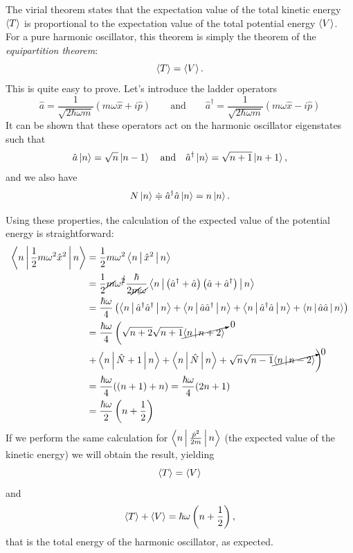 \documentclass[a4paper,twoside,11pt]{book}
\begin{document}
The virial theorem states that the expectation value of the total kinetic energy $\Braket{T}$ is proportional to the expectation value of the total potential energy $\Braket{V}$. For a pure harmonic oscillator, this theorem is simply the theorem of the \emph{equipartition theorem}:
\begin{equation}
	\Braket{T} = \Braket{V}.
\end{equation}
This is quite easy to prove. Let's introduce the ladder operators
\begin{equation}
	\hat{a}=\frac{1}{\sqrt{2 \hbar \omega m}} \left( m \omega \hat{x}+ i \hat{p} \right)
	\qquad \text{and} \qquad
	\hat{a}^{\dagger}=\frac{1}{\sqrt{2 \hbar \omega m}} \left( m \omega \hat{x}- i \hat{p} \right)
\end{equation}
It can be shown that these operators act on the harmonic oscillator eigenstates such that
\begin{equation}
	\hat{a} \Ket{n} =\sqrt{n} \Ket{n-1}
	\quad \text{and} \quad 
	\hat{a}^{\dagger} \Ket{n} =\sqrt{n+1} \Ket{n+1},
\end{equation}
and we also have
\begin{equation}
	N\Ket{n} \doteqdot \hat{a}^{\dagger}\hat{a}\Ket{n} = n\Ket{n}.
\end{equation}

Using these properties, the calculation of the expected value of the potential energy is straightforward:
\begin{align}
	\Braket{n|\frac{1}{2}m\omega^2\hat{x}^2|n}
	&= \frac{1}{2}m\omega^2\Braket{n|\hat{x}^2|n} \\
	&= \frac{1}{2}\cancel{m}\omega^{\cancel{2}}\frac{\hbar}{2\cancel{m}\cancel{\omega}}\Braket{n|\left(\hat{a}^{\dagger}+\hat{a}\right)\left(\hat{a}+\hat{a}^{\dagger}\right)|n} \\
	&= \frac{\hbar\omega}{4} \left(\Braket{n|\hat{a}^{\dagger}\hat{a}^{\dagger}|n}+\Braket{n|\hat{a}\hat{a}^{\dagger}|n}+\Braket{n|\hat{a}^{\dagger}\hat{a}|n}+\Braket{n|\hat{a}\hat{a}|n}\right) \\
	&= \frac{\hbar\omega}{4} \left(\sqrt{n+2}\sqrt{n+1}\cancelto{0}{\Braket{n|n+2}}\right. \\
	&\left.+\Braket{n|\hat{N}+1|n}+\Braket{n|\hat{N}|n}+\sqrt{n}\sqrt{n-1}\cancelto{0}{\Braket{n|n-2}}\right) \\
	&= \frac{\hbar\omega}{4}((n+1)+n) = \frac{\hbar\omega}{4}(2n+1) \\
	&= \frac{\hbar\omega}{2}\left(n+\frac{1}{2}\right)
\end{align}
If we perform the same calculation for $\Braket{n|\frac{\hat{p}^2}{2m}|n}$ (the expected value of the kinetic energy) we will obtain the result, yielding
\begin{equation}
	\Braket{T} = \Braket{V}
\end{equation}
and
\begin{equation}
	\Braket{T}+\Braket{V} = \hbar\omega\left(n+\frac{1}{2}\right),
\end{equation}
that is the total energy of the harmonic oscillator, as expected.
\end{document}
